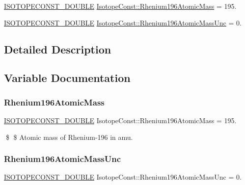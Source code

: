 \begin{DoxyCompactItemize}
\item 
\mbox{\hyperlink{group___isotope_const-_macros_ga8f45a7272ce02c0b4c65c44636ed719a}{I\+S\+O\+T\+O\+P\+E\+C\+O\+N\+S\+T\+\_\+\+D\+O\+U\+B\+LE}} \mbox{\hyperlink{group___isotope_const-_rhenium-_re196_ga954b2d4dd68262d7d6538904d7bcb6f3}{Isotope\+Const\+::\+Rhenium196\+Atomic\+Mass}} = 195.
\item 
\mbox{\hyperlink{group___isotope_const-_macros_ga8f45a7272ce02c0b4c65c44636ed719a}{I\+S\+O\+T\+O\+P\+E\+C\+O\+N\+S\+T\+\_\+\+D\+O\+U\+B\+LE}} \mbox{\hyperlink{group___isotope_const-_rhenium-_re196_ga4d80d99414ac1b6c1796068672932875}{Isotope\+Const\+::\+Rhenium196\+Atomic\+Mass\+Unc}} = 0.
\end{DoxyCompactItemize}


\subsection{Detailed Description}


\subsection{Variable Documentation}
\mbox{\label{group___isotope_const-_rhenium-_re196_ga954b2d4dd68262d7d6538904d7bcb6f3}} 
\subsubsection{\texorpdfstring{Rhenium196\+Atomic\+Mass}{Rhenium196AtomicMass}}
{\footnotesize\ttfamily \mbox{\hyperlink{group___isotope_const-_macros_ga8f45a7272ce02c0b4c65c44636ed719a}{I\+S\+O\+T\+O\+P\+E\+C\+O\+N\+S\+T\+\_\+\+D\+O\+U\+B\+LE}} Isotope\+Const\+::\+Rhenium196\+Atomic\+Mass = 195.}

\$ \$ Atomic mass of Rhenium-\/196 in amu. \mbox{\label{group___isotope_const-_rhenium-_re196_ga4d80d99414ac1b6c1796068672932875}} 
\subsubsection{\texorpdfstring{Rhenium196\+Atomic\+Mass\+Unc}{Rhenium196AtomicMassUnc}}
{\footnotesize\ttfamily \mbox{\hyperlink{group___isotope_const-_macros_ga8f45a7272ce02c0b4c65c44636ed719a}{I\+S\+O\+T\+O\+P\+E\+C\+O\+N\+S\+T\+\_\+\+D\+O\+U\+B\+LE}} Isotope\+Const\+::\+Rhenium196\+Atomic\+Mass\+Unc = 0.}

